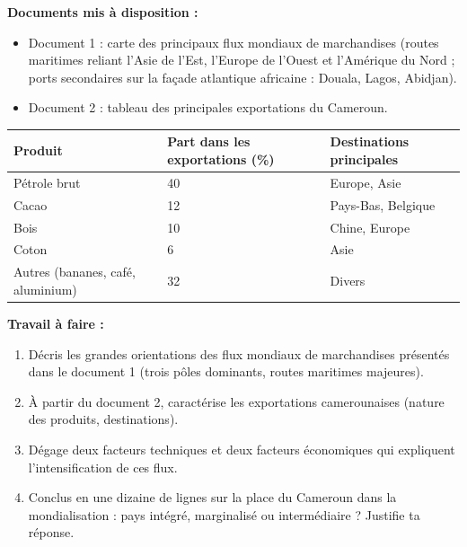 \documentclass[11pt]{article}
\begin{document}
\begin{exercice}
\textbf{Documents mis à disposition :}
\begin{itemize}
\item Document 1 : carte des principaux flux mondiaux de marchandises (routes maritimes reliant l'Asie de l'Est, l'Europe de l'Ouest et l'Amérique du Nord ; ports secondaires sur la façade atlantique africaine : Douala, Lagos, Abidjan).
\item Document 2 : tableau des principales exportations du Cameroun.
\end{itemize}
\begin{center}
\begin{tabularx}{\linewidth}{|l|X|X|}
\hline
\rowcolor{popblueL} Produit & Part dans les exportations (\%) & Destinations principales \\
\hline
Pétrole brut & 40 & Europe, Asie \\
\hline
Cacao & 12 & Pays-Bas, Belgique \\
\hline
Bois & 10 & Chine, Europe \\
\hline
Coton & 6 & Asie \\
\hline
Autres (bananes, café, aluminium) & 32 & Divers \\
\hline
\end{tabularx}
\end{center}
\textbf{Travail à faire :}
\begin{enumerate}
\item Décris les grandes orientations des flux mondiaux de marchandises présentés dans le document 1 (trois pôles dominants, routes maritimes majeures).
\item À partir du document 2, caractérise les exportations camerounaises (nature des produits, destinations).
\item Dégage deux facteurs techniques et deux facteurs économiques qui expliquent l'intensification de ces flux.
\item Conclus en une dizaine de lignes sur la place du Cameroun dans la mondialisation : pays intégré, marginalisé ou intermédiaire ? Justifie ta réponse.
\end{enumerate}
\end{exercice}
\end{document}
